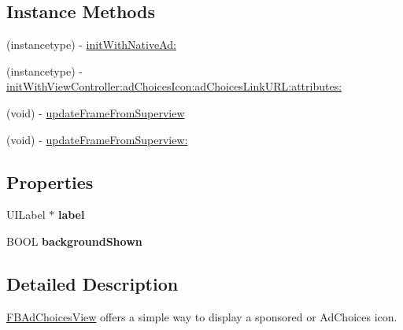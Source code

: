 \subsection*{Instance Methods}
\begin{DoxyCompactItemize}
\item 
(instancetype) -\/ \hyperlink{interface_f_b_ad_choices_view_a371d84a1f8d09fadf78baed0dfdd8eb0}{init\-With\-Native\-Ad\-:}
\item 
(instancetype) -\/ \hyperlink{interface_f_b_ad_choices_view_a5c791209142cd85bdd2b4141d393a848}{init\-With\-View\-Controller\-:ad\-Choices\-Icon\-:ad\-Choices\-Link\-U\-R\-L\-:attributes\-:}
\item 
(void) -\/ \hyperlink{interface_f_b_ad_choices_view_afb745d0916518332332c8be6fd27c124}{update\-Frame\-From\-Superview}
\item 
(void) -\/ \hyperlink{interface_f_b_ad_choices_view_a1d70a07432b8fbffdba6a657c9936783}{update\-Frame\-From\-Superview\-:}
\end{DoxyCompactItemize}
\subsection*{Properties}
\begin{DoxyCompactItemize}
\item 
\hypertarget{interface_f_b_ad_choices_view_a3047ea9be013ded63b55e636ed7fcc1b}{U\-I\-Label $\ast$ {\bfseries label}}\label{interface_f_b_ad_choices_view_a3047ea9be013ded63b55e636ed7fcc1b}

\item 
\hypertarget{interface_f_b_ad_choices_view_a0d74165779307d79555cac3f112e0744}{B\-O\-O\-L {\bfseries background\-Shown}}\label{interface_f_b_ad_choices_view_a0d74165779307d79555cac3f112e0744}

\end{DoxyCompactItemize}


\subsection{Detailed Description}
\hyperlink{interface_f_b_ad_choices_view}{F\-B\-Ad\-Choices\-View} offers a simple way to display a sponsored or Ad\-Choices icon. 

